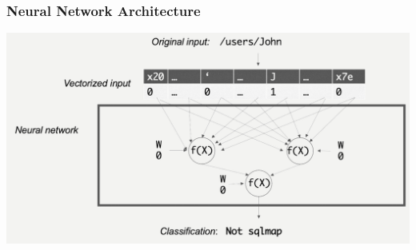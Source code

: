 \begin{frame}
\frametitle{Neural Network Architecture}
\includegraphics[width=\textwidth]{res/nn-architecture.png}
\end{frame}